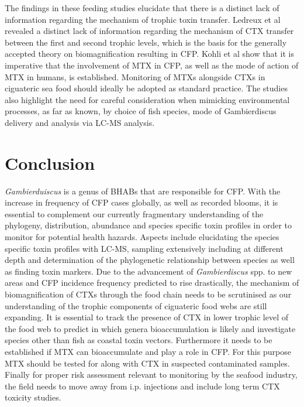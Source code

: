 \documentclass[12pt]{article}
\begin{document}
The findings in these feeding studies elucidate that there is a distinct lack of information regarding the mechanism of trophic toxin transfer. Ledreux et al revealed a distinct lack of information regarding the mechanism of CTX transfer between the first and second trophic levels, which is the basis for the generally accepted theory on biomagnification resulting in CFP. Kohli et al show that it is imperative that the involvement of MTX in CFP, as well as the mode of action of MTX in humans, is established. Monitoring of MTXs alongside CTXs in ciguateric sea food should ideally be adopted as standard practice. The studies also highlight the need for careful consideration when mimicking environmental processes, as far as known, by choice of fish species, mode of Gambierdiscus delivery and analysis via LC-MS analysis.


\section{Conclusion}
\emph{Gambierduiscus} is a genus of BHABs that are responsible for CFP. With the increase in frequency of CFP cases globally, as well as recorded blooms, it is essential to complement our currently fragmentary understanding of the phylogeny, distribution, abundance and species specific toxin profiles in order to monitor for potential health hazards. Aspects include elucidating the species specific toxin profiles with LC-MS, sampling extensively including at different depth and determination of the phylogenetic relationship between species as well as finding toxin markers.
Due to the  advancement of \emph{Gambierdiscus} spp. to new areas and CFP incidence frequency predicted to rise drastically, the mechanism of biomagnification of CTXs through the food chain needs to be scrutinised as our understanding of the trophic components of ciguateric food webs are still expanding.
It is essential to track the presence of CTX in lower trophic level of the food web to predict in which genera bioaccumulation is likely \cite{mak2013pacific} and investigate species other than fish as coastal toxin vectors. Furthermore it needs to be established if MTX can bioaccumulate and play a role in CFP. For this purpose MTX should be tested for along with CTX in suspected contaminated samples.
Finally for proper risk assessment relevant to monitoring by the seafood industry, the field needs to move away from i.p. injections and include long term CTX toxicity studies.

\newpage



\end{document}
